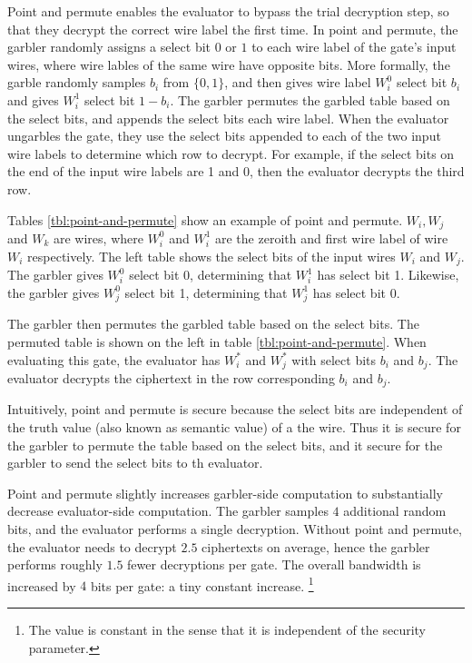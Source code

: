 Point and permute enables the evaluator to bypass the trial decryption step, so that they decrypt the correct wire label the first time.
In point and permute, the garbler randomly assigns a select bit $0$ or $1$ to each wire label of the gate's input wires, where wire lables of the same wire have opposite bits.
More formally, the garble randomly samples $b_i$ from $\{0,1\}$, and then gives wire label $W_i^0$ select bit $b_i$ and gives $W_i^1$ select bit $1-b_i$.
The garbler permutes the garbled table based on the select bits, and appends the select bits each wire label.
When the evaluator ungarbles the gate, they use the select bits appended to each of the two input wire labels to determine which row to decrypt.
For example, if the select bits on the end of the input wire labels are 1 and 0, then the evaluator decrypts the third row.

Tables \ref{tbl:point-and-permute} show an example of point and permute.
$W_i, W_j$ and $W_k$ are wires, where $W_i^0$ and $W_i^1$ are the zeroith and first wire label of wire $W_i$ respectively.
The left table shows the select bits of the input wires $W_i$ and $W_j$.
The garbler gives $W_i^0$ select bit 0, determining that $W_i^1$ has select bit 1.
Likewise, the garbler gives $W_j^0$ select bit 1, determining that $W_j^1$ has select bit 0.

The garbler then permutes the garbled table based on the select bits. 
The permuted table is shown on the left in table \ref{tbl:point-and-permute}.
When evaluating this gate, the evaluator has $W_i^*$ and $W_j^*$ with select bits $b_i$ and $b_j$.
The evaluator decrypts the ciphertext in the row corresponding $b_i$ and $b_j$.

Intuitively, point and permute is secure because the select bits are independent of the truth value (also known as semantic value) of a the wire.
Thus it is secure for the garbler to permute the table based on the select bits, and it secure for the garbler to send the select bits to th evaluator.

Point and permute slightly increases garbler-side computation to substantially decrease evaluator-side computation.
The garbler samples $4$ additional random bits, and the evaluator performs a single decryption.
Without point and permute, the evaluator needs to decrypt $2.5$ ciphertexts on average, hence the garbler performs roughly $1.5$ fewer decryptions per gate.
The overall bandwidth is increased by $4$ bits per gate: a tiny constant increase. \footnote{The value is constant in the sense that it is independent of the security parameter.}

